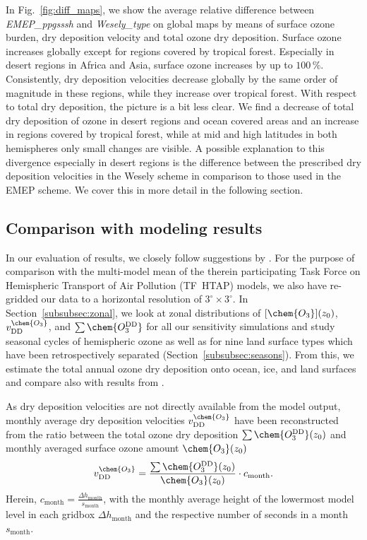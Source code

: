 \documentclass[gmd, manuscript]{copernicus}
\begin{document}
In Fig.~\ref{fig:diff_maps}, we show the average relative difference between \emph{EMEP\_ppgsssh} and \emph{Wesely\_type} on global maps by means of surface ozone burden, dry deposition velocity and total ozone dry deposition. Surface ozone increases globally except for regions covered by tropical forest. Especially in desert regions in Africa and Asia, surface ozone increases by up to $100\,\unit{\%}$. Consistently, dry deposition velocities decrease globally by the same order of magnitude in these regions, while they increase over tropical forest. With respect to total dry deposition, the picture is a bit less clear. We find a decrease of total dry deposition of ozone in desert regions and ocean covered areas and an increase in regions covered by tropical forest, while at mid and high latitudes in both hemispheres only small changes are visible. A possible explanation to this divergence especially in desert regions is the difference between the prescribed dry deposition velocities in the Wesely scheme in comparison to those used in the EMEP scheme. We cover this in more detail in the following section.

\subsection{Comparison with modeling results}
\label{subsec:model}
%
In our evaluation of results, we closely follow suggestions by \citet{ACP:Hardacre2015}. For the purpose of comparison with the multi-model mean of the therein participating Task Force on Hemispheric Transport of Air Pollution (TF~HTAP) models, we also have re-gridded our data to a horizontal resolution of $3^\circ\times 3^\circ$. In Section~\ref{subsubsec:zonal}, we look at zonal distributions of $[\chem{O_3}](z_0)$, $v^\chem{O_3}_\text{DD}$, and $\sum\chem{O_3^\text{DD}}$ for all our sensitivity simulations and study seasonal cycles of hemispheric ozone as well as for nine land surface types which have been retrospectively separated (Section~\ref{subsubsec:seasons}). From this, we estimate the total annual ozone dry deposition onto ocean, ice, and land surfaces and compare also with results from \citet{ACP:Luhar2017}.

As dry deposition velocities are not directly available from the model output, monthly average dry deposition velocities $v^\chem{O_3}_\text{DD}$ have been reconstructed from the ratio between the total ozone dry deposition $\sum \chem{O_3^\text{DD}}(z_0)$ and monthly averaged surface ozone amount $\chem{O_3}(z_0)$ 
\begin{equation}
  v^\chem{O_3}_\text{DD} = \frac{\sum \chem{O_3^\text{DD}}(z_0)}{\chem{O_3}(z_0)}\cdot c_\text{month}.
\end{equation}
Herein, $c_\text{month} = \frac{\Delta h_\text{month}}{s_\text{month}}$, with the monthly average height of the lowermost model level in each gridbox $\Delta h_\text{month}$ and the respective number of seconds in a month $s_\text{month}$.
%
\end{document}
